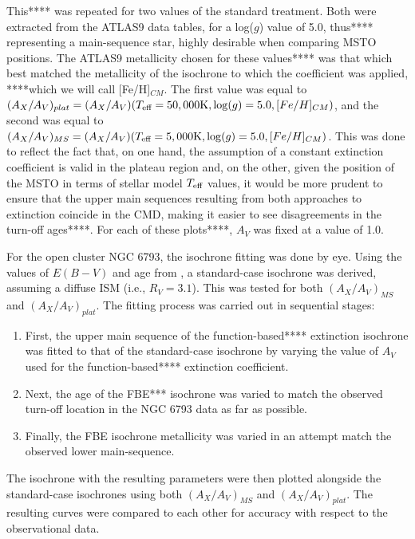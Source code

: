 \documentclass[12pt, a4paper]{report}
\begin{document}
This**** was repeated for two values of the standard treatment. Both were extracted from the ATLAS9 data tables, for a log($g$) value of 5.0, thus**** representing a main-sequence star, highly desirable when comparing MSTO positions. The ATLAS9 metallicity chosen for these values**** was that which best matched the metallicity of the isochrone to which the coefficient was applied, ****which we will call [Fe/H]$_{CM}$. The first value was equal to $(A_{X}/A_{V})_{plat} = (A_{X}/A_{V})(T_{\textnormal{eff}} = 50,000\textnormal{K},\log(g) = 5.0,[Fe/H]_{CM})$, and the second was equal to  $(A_{X}/A_{V})_{MS} = (A_{X}/A_{V})(T_{\textnormal{eff}} = 5,000\textnormal{K},\log(g) = 5.0,[Fe/H]_{CM})$. This was done to reflect the fact that, on one hand, the assumption of a constant extinction coefficient is valid in the plateau region and, on the other, given the position of the MSTO in terms of stellar model $T_{\textnormal{eff}}$ values, it would be more prudent to ensure that the upper main sequences resulting from both approaches to extinction coincide in the CMD, making it easier to see disagreements in the turn-off ages****. For each of these plots****, $A_{V}$ was fixed at a value of 1.0.

For the open cluster NGC 6793, the isochrone fitting was done by eye. Using the values of $E(B-V)$ and age from \cite{2018A&A...616A..10G}, a standard-case isochrone was derived, assuming a diffuse ISM (i.e., $R_{V} = 3.1$). This was tested for both $(A_{X}/A_{V})_{MS}$ and $(A_{X}/A_{V})_{plat}$. The fitting process was carried out in sequential stages:
\begin{enumerate}
\item First, the upper main sequence of the function-based**** extinction isochrone was fitted to that of the standard-case isochrone by varying the value of $A_{V}$ used for the function-based**** extinction coefficient.
\item Next, the age of the FBE*** isochrone was varied to match the observed turn-off location in the NGC 6793 data as far as possible.
\item Finally, the FBE isochrone metallicity was varied in an attempt match the observed lower main-sequence.
\end{enumerate}

The isochrone with the resulting parameters were then plotted alongside the standard-case isochrones using both $(A_{X}/A_{V})_{MS}$ and $(A_{X}/A_{V})_{plat}$. The resulting curves were compared to each other for accuracy with respect to the observational data.
\end{document}

